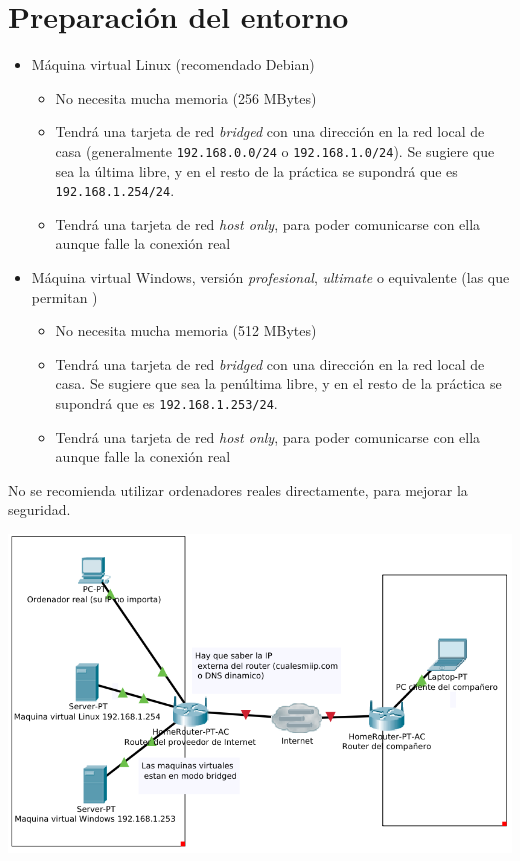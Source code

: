 \section{Preparación del entorno}
\begin{itemize}
\item Máquina virtual Linux (recomendado Debian)
  \begin{itemize}
  \item No necesita mucha memoria (256 MBytes)
  \item Tendrá una tarjeta de red \textit{bridged} con una dirección en la red local de casa (generalmente \texttt{192.168.0.0/24} o \texttt{192.168.1.0/24}). Se sugiere que sea la última libre, y en el resto de la práctica se supondrá que es \texttt{192.168.1.254/24}.
  \item Tendrá una tarjeta de red \textit{host only}, para poder comunicarse con ella aunque falle la conexión real 
  \end{itemize}

\item Máquina virtual Windows, versión \textit{profesional}, \textit{ultimate} o equivalente (las que permitan )
  \begin{itemize}
  \item No necesita mucha memoria (512 MBytes)    
  \item Tendrá una tarjeta de red \textit{bridged} con una dirección en la red local de casa. Se sugiere que sea la penúltima libre, y en el resto de la práctica se supondrá que es \texttt{192.168.1.253/24}.
  \item Tendrá una tarjeta de red \textit{host only}, para poder comunicarse con ella aunque falle la conexión real 
  \end{itemize}
\end{itemize}

No se recomienda utilizar ordenadores reales directamente, para mejorar la seguridad.

\includegraphics[width=\textwidth]{./media/practica-nat-en-casa.png}


